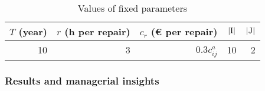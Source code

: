 \documentclass[preprint,12pt]{elsarticle}
\begin{document}
\begin{table}[htbp]
  \centering
  \caption{Values of fixed parameters}
    \begin{tabular}{rrrrr}
    \toprule
    $T$ (year) & $r$ (h per repair) & $c_{r}$ (€ per repair) & \(\lvert $I$ \rvert\)   & \(\lvert $J$\rvert\) \\
    \midrule
    10    & 3     & 0.3$c_{ij}^{a}$ & 10    & 2 \\
    \bottomrule
    \end{tabular}%
  \label{tab:addlabel}%
\end{table}%



\subsubsection{Results and managerial insights}
\end{document}
